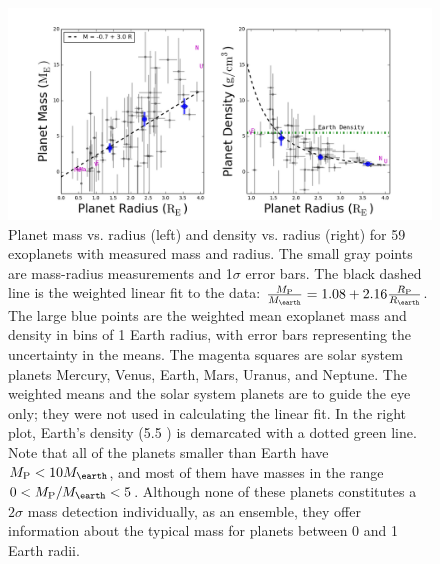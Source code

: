 \documentclass[iop]{emulateapj}
\begin{document}
\begin{figure}[htbp] %
   \centering
    \includegraphics[width=6in]{mr_small.png} 
   \caption{\small Planet mass vs. radius (left) and density vs. radius (right) for 59 exoplanets with measured mass and radius.  The small gray points are mass-radius measurements and 1$\sigma$ error bars.  The black dashed line is the weighted linear fit to the data: $\frac{\mpl}{\mearth} = 1.08 + 2.16 \frac{\rpl}{\rearth}$.  The large blue points are the weighted mean exoplanet mass and density in bins of 1 Earth radius, with error bars representing the uncertainty in the means.  The magenta squares are solar system planets Mercury, Venus, Earth, Mars, Uranus, and Neptune. The weighted means and the solar system planets are to guide the eye only; they were not used in calculating the linear fit.  In the right plot, Earth's density (5.5 \gcc) is demarcated with a dotted green line.  Note that all of the planets smaller than Earth have $\mpl < 10 \mearth$, and most of them have masses in the range $0 < \mpl/\mearth < 5$.  Although none of these planets constitutes a $2\sigma$ mass detection individually, as an ensemble, they offer information about the typical mass for planets between 0 and 1 Earth radii.}
   \label{fig:rm_4}
\end{figure}
\end{document}
